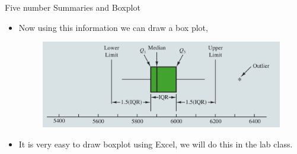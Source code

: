 \documentclass[8pt, usepdftitle=false]{beamer}
\begin{document}
\begin{frame}[allowframebreaks]{Five number Summaries and Boxplot}
\begin{itemize}
  \item Now using this information we can draw a box plot, 


  \begin{figure}
    \includegraphics[scale = .25]{Images/Boxplot.png}
  \end{figure}

  \item It is very easy to draw boxplot using Excel, we will do this in the lab class.



\end{itemize}
  
\end{frame}
\end{document}
